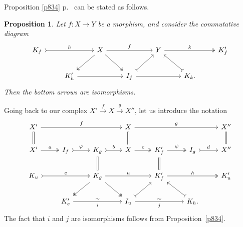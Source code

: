 \documentclass[12pt]{article}
\newtheorem{prop}[thm]{Proposition}
\theoremstyle{remark}
\theoremstyle{definition}
\begin{document}
Proposition \ref{p834} p.~\pageref{p834} can be stated as follows. 
%
\begin{prop}\label{p834b}
Let $f:X\to Y$ be a morphism, and consider the commutative diagram 
$$
\begin{tikzcd}
K_f\ar[tail]{rr}{h}&&X\ar{rr}{f}\ar[two heads]{dl}\ar[two heads]{dr}&&Y\ar[two heads]{rr}{k}&&K'_f\\ 
&K'_h\ar{rr}&&I_f\ar[tail]{ur}\ar{rr}&&K_k.\ar[tail]{ul}
\end{tikzcd}
$$ 
Then the bottom arrows are isomorphisms.
\end{prop}
%
Going back to our complex $X'\overset{f}{\to}X\overset{g}{\to}X''$, let us introduce the notation 
$$
\begin{tikzcd}
X'\ar{rrr}{f}\ar[equal]{d}&&&X\ar[equal]{d}\ar{rrr}{g}&&&X''\ar[equal]{d}\\ 
X'\ar[two heads]{r}{a}&I_f\ar[tail]{r}{\varphi}&K_g\ar[equal]{d}\ar[tail]{r}{b}&X\ar[two heads]{r}{c}&K'_f\ar[equal]{d}\ar[two heads]{r}{\psi}&I_g\ar[tail]{r}{d}&X''\\ 
K_u\ar[tail]{rr}{e}&&K_g\ar[two heads]{dl}\ar[two heads]{dr}\ar{rr}{u}&&K'_f\ar[two heads]{rr}{h}&&K'_u\\ 
&K'_e\ar{rr}{\sim}[swap]{i}&&I_u\ar[tail]{ur}\ar{rr}{\sim}[swap]{j}&&K_h.\ar[tail]{ul}
\end{tikzcd}
$$ 
The fact that $i$ and $j$ are isomorphisms follows from Proposition~\ref{p834}. 
\end{document}
